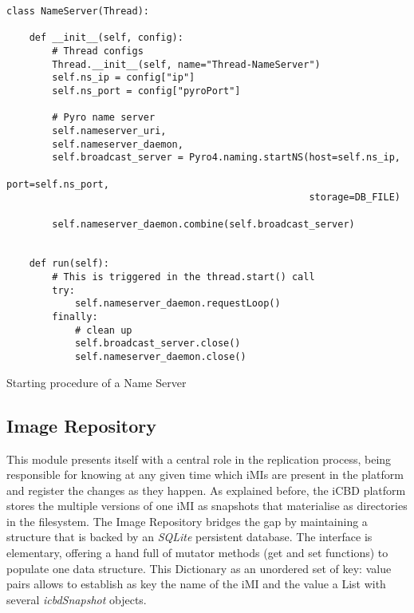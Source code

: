

\begin{listing}[h!]
\begin{verbatim}
class NameServer(Thread):

	def __init__(self, config):
		# Thread configs
        Thread.__init__(self, name="Thread-NameServer")
        self.ns_ip = config["ip"]
        self.ns_port = config["pyroPort"]

        # Pyro name server
        self.nameserver_uri, 
        self.nameserver_daemon, 
        self.broadcast_server = Pyro4.naming.startNS(host=self.ns_ip,
                                                     port=self.ns_port,
                                                     storage=DB_FILE)

        self.nameserver_daemon.combine(self.broadcast_server)


	def run(self):
        # This is triggered in the thread.start() call
        try:
            self.nameserver_daemon.requestLoop()
        finally:
            # clean up
            self.broadcast_server.close()
            self.nameserver_daemon.close()
\end{verbatim}
\caption{Starting procedure of a Name Server}
\label{listing:icbd_nameserver}
\end{listing}



\subsection{Image Repository}
\label{sub:rep_image_repo}

This module presents itself with a central role in the replication process, being responsible for knowing at any given time which iMIs are present in the platform and register the changes as they happen.
As explained before, the iCBD platform stores the multiple versions of one iMI as snapshots that materialise as directories in the filesystem. The Image Repository bridges the gap by maintaining a structure that is backed by an \textit{SQLite} persistent database. The interface is elementary, offering a hand full of mutator methods (get and set functions) to populate one data structure. This Dictionary as an unordered set of key: value pairs allows to establish as key the name of the iMI and the value a List with several \textit{icbdSnapshot} objects. 

